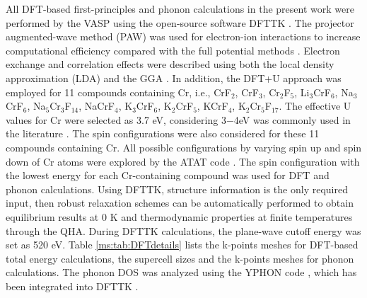 All DFT-based first-principles and phonon calculations in the present work were performed by the VASP \cite{kresse1996efficient} using the open-source software DFTTK \cite{wang2021dfttk}. The projector augmented-wave method (PAW) was used for electron-ion interactions to increase computational efficiency compared with the full potential methods \cite{blochl1994projector, kresse1999ultrasoft}. Electron exchange and correlation effects were described using both the local density approximation (LDA) \cite{perdew1981self} and the GGA \cite{perdew1996generalized}. In addition, the DFT+U approach was employed for 11 compounds containing Cr, i.e., CrF${_2}$, CrF${_3}$, Cr$_2$F$_5$, Li$_3$CrF$_6$, Na$_3$CrF$_6$, Na$_5$Cr$_3$F$_{14}$, NaCrF$_4$, K$_3$CrF$_6$, K$_2$CrF$_5$, KCrF$_4$, K$_2$Cr$_5$F$_{17}$. The effective U values for Cr were selected as 3.7 eV, considering 3$-$4eV was commonly used in the literature \cite{shi2009magnetism, mattsson2019density, huang2022dft}. The spin configurations were also considered for these 11 compounds containing Cr. All possible configurations by varying spin up and spin down of Cr atoms were explored by the ATAT code \cite{van2009multicomponent}. The spin configuration with the lowest energy for each Cr-containing compound was used for DFT and phonon calculations. Using DFTTK, structure information is the only required input, then robust relaxation schemes can be automatically performed to obtain equilibrium results at 0 K and thermodynamic properties at finite temperatures through the QHA. During DFTTK calculations, the plane-wave cutoff energy was set as 520 eV. Table \ref{ms:tab:DFTdetails} lists the k-points meshes for DFT-based total energy calculations, the supercell sizes and the k-points meshes for phonon calculations. The phonon DOS was analyzed using the YPHON code \cite{wang2014yphon}, which has been integrated into DFTTK \cite{wang2021dfttk}. 

